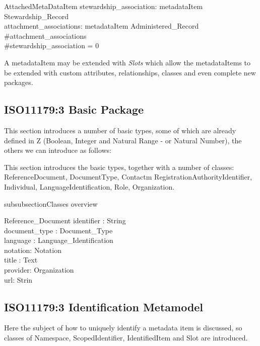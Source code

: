 \documentclass{llncs}
\begin{document}
\begin{schema}{AttachedMetaDataItem}
stewardship\_association: metadataItem \pfun Stewardship\_Record \\
attachment\_associations: metadataItem \pfun Administered\_Record \\
\where
 \#attachment\_associations  \\
 \#stewardship\_association = 0 \\
\end{schema}


A metadataItem may be extended with \emph{Slots} which allow the metadataItems to be extended with custom attributes, relationships, classes and even complete new packages.

\subsection{ISO11179:3 Basic Package}

This section introduces a number of basic types, some of which are already defined in Z (Boolean, Integer and Natural Range - or Natural Number), the others we can introduce as follows:
\begin{zed}
\end{zed}
This section introduces the basic types, together with a number of classes: ReferenceDocument, DocumentType, Contactm RegistrationAuthorityIdentifier, Individual, LanguageIdentification, Role, Organization.


subsubsection{Classes overview}


\begin{class}{Reference\_Document}
\also
identifier : String \\
document\_type : Document\_Type \\
language : Language\_Identification \\
notation: Notation \\
title : Text\\
provider: Organization\\
url: Strin
\end{class}




\subsection{ISO11179:3 Identification Metamodel }
Here the subject of how to uniquely identify a metadata item is discussed, so classes of Namespace, ScopedIdentifier, IdentifiedItem and Slot are introduced.
\end{document}
